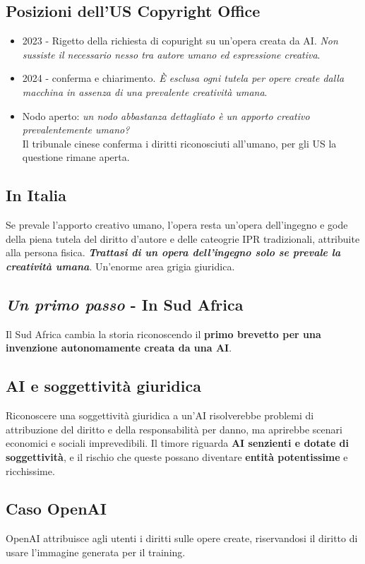 \subsection{Posizioni dell'US Copyright Office}
\begin{itemize}
	\item 2023 - Rigetto della richiesta di copuright su un'opera creata da AI. \textit{Non sussiste il necessario nesso tra autore umano ed espressione creativa}.
	\item 2024 - conferma e chiarimento.\textit{ È esclusa ogni tutela per opere create dalla macchina in assenza di una prevalente creatività umana}.
	\item Nodo aperto: \textit{un nodo abbastanza dettagliato è un apporto creativo prevalentemente umano?} \\
	Il tribunale cinese conferma i diritti riconosciuti all'umano, per gli US la questione rimane aperta.
\end{itemize}

\subsection{In Italia}
Se prevale l'apporto creativo umano, l'opera resta un'opera dell'ingegno e gode della piena tutela del diritto d'autore e delle cateogrie IPR tradizionali, attribuite alla persona fisica.
\textit{\textbf{Trattasi di un opera dell'ingegno solo se prevale la creatività umana}}. Un'enorme area grigia giuridica.

\subsection{\textit{Un primo passo }- In Sud Africa}
Il Sud Africa cambia la storia riconoscendo il \textbf{primo brevetto per una invenzione autonomamente creata da una AI}.

\subsection{AI e soggettività giuridica}
Riconoscere una soggettività giuridica a un'AI risolverebbe problemi di attribuzione del diritto e della responsabilità per danno, ma aprirebbe scenari economici e sociali imprevedibili. Il timore riguarda \textbf{AI senzienti e dotate di soggettività}, e il rischio che queste possano diventare \textbf{entità potentissime} e ricchissime.

\subsection{Caso OpenAI}
OpenAI attribuisce agli utenti i diritti sulle opere create, riservandosi il diritto di usare l'immagine generata per il training.

